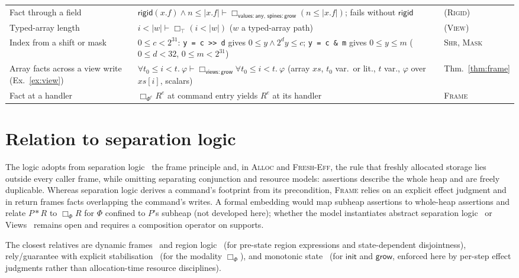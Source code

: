 \documentclass[10pt,a4paper]{article}
\theoremstyle{definition}
\theoremstyle{remark}
\newcommand{\bx}[1]{\Box_{#1}}
\newcommand{\kw}[1]{\mathsf{#1}}
\newcommand{\init}{\kw{init}}
\newcommand{\grow}{\kw{grow}}
\newcommand{\any}{\kw{any}}
\newcommand{\val}{\kw{values}}
\newcommand{\st}{\kw{spines}}
\newcommand{\vw}{\kw{views}}
\newcommand{\rigid}{\kw{rigid}}
\newcommand{\len}[1]{|#1|}
\newcommand{\code}[1]{\texttt{#1}}
\begin{document}
\begin{center}
\begin{tabularx}{\textwidth}{@{}>{\raggedright\arraybackslash}p{}>{\raggedright\arraybackslash}Xl@{}}
Fact through a field & $\rigid(x.f)\wedge n\le\len{x.f}\vdash\bx{\val:\any,\,\st:\grow}(n\le\len{x.f})$; fails without $\rigid$ & \textsc{(Rigid)}\\[3pt]
Typed-array length & $i<\len w\vdash\bx{\top}(i<\len w)$ ($w$ a typed-array path) & \textsc{(View)}\\[3pt]
Index from a shift or mask & $0\le c<2^{31}$: \code{y = c >> d} gives $0\le y\wedge 2^{d}y\le c$; \code{y = c \& m} gives $0\le y\le m$ ($0\le d<32$, $0\le m<2^{31}$) & \textsc{Shr}, \textsc{Mask}\\[3pt]
Array facts across a view write (Ex.~\ref{ex:view}) & $\forall t_0\le i<t.\ \varphi\vdash\bx{\vw:\grow}\forall t_0\le i<t.\ \varphi$ (array $\mathit{xs}$, $t_0$ var.\ or lit., $t$ var., $\varphi$ over $\mathit{xs}[i]$, scalars) & Thm.~\ref{thm:frame}\\[3pt]
Fact at a handler & $\bx{\Phi^{e}}R^{e}$ at command entry yields $R^{e}$ at its handler & \textsc{Frame}\\
\bottomrule
\end{tabularx}
\end{center}

\section{Relation to separation logic}\label{sec:related}

The logic adopts from separation logic~\cite{ohearn} the frame principle
and, in \textsc{Alloc} and \textsc{Fresh-Eff}, the rule that freshly
allocated storage lies outside every caller frame, while omitting
separating conjunction and resource models: assertions describe the whole
heap and are freely duplicable. Whereas separation logic derives a
command's footprint from its precondition, \textsc{Frame} relies on an
explicit effect judgment and in return frames facts overlapping the
command's writes. A formal embedding would map subheap assertions to
whole-heap assertions and relate $P\ast R$ to $\bx{\Phi}R$ for $\Phi$
confined to $P$'s subheap (not developed here); whether the model
instantiates abstract separation logic~\cite{coy} or Views~\cite{views}
remains open and requires a composition operator on supports.

The closest relatives are dynamic frames~\cite{kassios} and region
logic~\cite{bnr} (for pre-state region expressions and state-dependent
disjointness), rely/guarantee with explicit
stabilisation~\cite{jones,wickerson} (for the modality $\bx{\Phi}$), and
monotonic state~\cite{adr,ahman} (for $\init$ and $\grow$, enforced here
by per-step effect judgments rather than allocation-time resource
disciplines).
\end{document}

